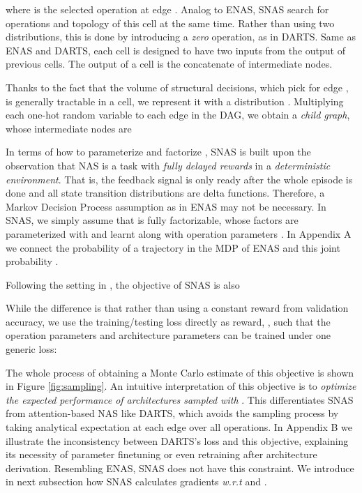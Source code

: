\documentclass{article} \usepackage{iclr2019_conference,times}
\newcommand{\zh}{\color{black}}
\begin{document}
where  is the selected operation at edge . Analog to ENAS, SNAS search for operations and topology of this cell {\zh at} the same time. Rather than using two distributions, this is done by introducing a \textit{zero} operation, as in DARTS. Same as ENAS and DARTS, each cell is designed to have two inputs from the output of previous cells. The output of a cell is the concatenate of intermediate nodes.

Thanks to the fact that the volume of structural decisions, which pick  for edge , is generally tractable in a cell, we represent it with a distribution . Multiplying each one-hot random variable  to each edge  in the DAG, we obtain a \textit{child graph}, whose intermediate nodes are
 

In terms of how to parameterize and factorize , SNAS is built upon the observation that NAS is a task with \textit{fully delayed rewards} in a \textit{deterministic environment}. That is, the feedback signal is only ready after the whole episode is done and all state transition distributions are delta functions. Therefore, a Markov Decision Process assumption as in ENAS may not be necessary. In SNAS, we simply assume that  is fully factorizable, whose factors are parameterized with  and learnt along with operation parameters . In Appendix A we connect the probability of a trajectory in the MDP of ENAS and this joint probability . 

Following the setting in \citet{zoph2016neural}, the objective of SNAS is also

While the difference is that rather than using a constant reward from validation accuracy, we use the training/testing loss directly as reward, , such that the operation parameters and architecture parameters can be trained under one generic loss: 


The whole process of obtaining a Monte Carlo estimate of this objective is shown in Figure \ref{fig:sampling}. An intuitive interpretation of this objective is to \textit{optimize the expected performance of architectures sampled with }. This differentiates SNAS from attention-based NAS like DARTS, which avoids the sampling process by taking analytical expectation at each edge over all operations. In Appendix B we illustrate the inconsistency between DARTS's loss and this objective, explaining its necessity of parameter finetuning or even retraining after architecture derivation. Resembling ENAS, SNAS does not have this constraint. We introduce in next subsection how SNAS calculates gradients \textit{w.r.t}  and . 
\end{document}

